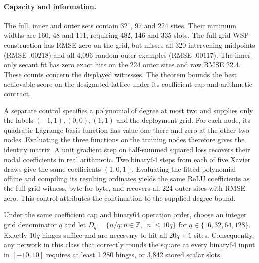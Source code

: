 \paragraph{Capacity and information.}
The full, inner and outer sets contain 321, 97 and 224 sites. Their minimum widths are 160, 48 and 111, requiring 482, 146 and 335 slots. The full-grid WSP construction has RMSE zero on the grid, but misses all 320 intervening midpoints (RMSE .00218) and all 4,096 random outer examples (RMSE .00117). The inner-only secant fit has zero exact hits on the 224 outer sites and raw RMSE 22.4. These counts concern the displayed witnesses. The theorem bounds the best achievable score on the designated lattice under its coefficient cap and arithmetic contract.

A separate control specifies a polynomial of degree at most two and supplies only the labels \((-1,1),(0,0),(1,1)\) and the deployment grid. For each node, its quadratic Lagrange basis function has value one there and zero at the other two nodes. Evaluating the three functions on the training nodes therefore gives the identity matrix. A unit gradient step on half-summed squared loss recovers their nodal coefficients in real arithmetic. Two binary64 steps from each of five Xavier draws give the same coefficients \((1,0,1)\). Evaluating the fitted polynomial offline and compiling its resulting ordinates yields the same ReLU coefficients as the full-grid witness, byte for byte, and recovers all 224 outer sites with RMSE zero. This control attributes the continuation to the supplied degree bound.

\begin{proposition}
\label{prop:fine-lattice}
Under the same coefficient cap and binary64 operation order, choose an integer grid denominator \(q\) and let
\(D_q=\{n/q:n\in\mathbb Z,\ |n|\le10q\}\) for
\(q\in\{16,32,64,128\}\). Exactly \(10q\) hinges suffice and are necessary
to hit all \(20q+1\) sites. Consequently, any network in this class that
correctly rounds the square at every binary64 input in \([-10,10]\)
requires at least 1,280 hinges, or 3,842 stored scalar slots.
\end{proposition}

